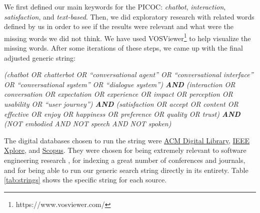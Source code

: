 We first defined our main keywords for the PICOC: \textit{chatbot}, \textit{interaction}, \textit{satisfaction}, and \textit{text-based}. Then, we did exploratory research with related words defined by us in order to see if the results were relevant and what were the missing words we did not think. We have used VOSViewer\footnote{https://www.vosviewer.com/} to help visualize the missing words. After some iterations of these steps, we came up with the final adjusted generic string:

\vspace{0.3cm}
\colorbox{formalshade}{\parbox{0.9\columnwidth}{\emph{(chatbot OR chatterbot OR ``conversational agent'' OR ``conversational interface'' OR ``conversational system'' OR ``dialogue system'') \textbf{AND} (interaction OR conversation OR expectation OR experience OR impact OR perception OR usability OR ``user journey'') \textbf{AND} (satisfaction OR accept OR content OR effective OR enjoy OR happiness OR preference OR quality OR trust) \textbf{AND} (NOT embodied AND NOT speech AND NOT spoken)}}}
\vspace{0.3cm}

The digital databases chosen to run the string were \href{https://dl.acm.org/}{ACM Digital Library}, \href{https://ieeexplore.ieee.org/Xplore/guesthome.jsp}{IEEE Xplore}, and  \href{https://www.scopus.com/}{Scopus}. They were chosen for being extremely relevant to software engineering research \cite{BreretonKBTK07}, for indexing a great number of conferences and journals, and for being able to run our generic search string directly in its entirety. Table \ref{tab:strings} shows the specific string for each source. 

